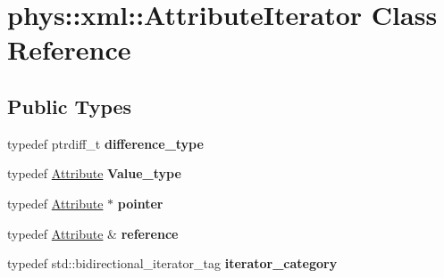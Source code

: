 \hypertarget{classphys_1_1xml_1_1AttributeIterator}{
\section{phys::xml::AttributeIterator Class Reference}
\label{de/d78/classphys_1_1xml_1_1AttributeIterator}
}
\subsection*{Public Types}
\begin{DoxyCompactItemize}
\item 
\hypertarget{classphys_1_1xml_1_1AttributeIterator_a04d891c0ff2a2122b8122dd872e4237e}{
typedef ptrdiff\_\-t {\bfseries difference\_\-type}}
\label{de/d78/classphys_1_1xml_1_1AttributeIterator_a04d891c0ff2a2122b8122dd872e4237e}

\item 
\hypertarget{classphys_1_1xml_1_1AttributeIterator_ab54a7992c134267b580edbcf78e481d8}{
typedef \hyperlink{classphys_1_1xml_1_1Attribute}{Attribute} {\bfseries Value\_\-type}}
\label{de/d78/classphys_1_1xml_1_1AttributeIterator_ab54a7992c134267b580edbcf78e481d8}

\item 
\hypertarget{classphys_1_1xml_1_1AttributeIterator_ab145be8859ba19f330b0e784343499e8}{
typedef \hyperlink{classphys_1_1xml_1_1Attribute}{Attribute} $\ast$ {\bfseries pointer}}
\label{de/d78/classphys_1_1xml_1_1AttributeIterator_ab145be8859ba19f330b0e784343499e8}

\item 
\hypertarget{classphys_1_1xml_1_1AttributeIterator_a9227aa824303a24a85124db7af006511}{
typedef \hyperlink{classphys_1_1xml_1_1Attribute}{Attribute} \& {\bfseries reference}}
\label{de/d78/classphys_1_1xml_1_1AttributeIterator_a9227aa824303a24a85124db7af006511}

\item 
\hypertarget{classphys_1_1xml_1_1AttributeIterator_aa34a1f322d8b952c25b52722db453d34}{
typedef std::bidirectional\_\-iterator\_\-tag {\bfseries iterator\_\-category}}
\label{de/d78/classphys_1_1xml_1_1AttributeIterator_aa34a1f322d8b952c25b52722db453d34}

\end{DoxyCompactItemize}
